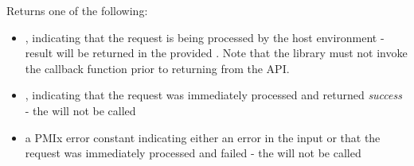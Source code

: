 \begin{arglist}
\end{arglist}

\descr

Returns one of the following:

\begin{itemize}
    \item {}, indicating that the request is being processed by the host environment - result will be returned in the provided . Note that the library must not invoke the callback function prior to returning from the \ac{API}.
    \item {}, indicating that the request was immediately processed and returned \textit{success} - the  will not be called
    \item a \ac{PMIx} error constant indicating either an error in the input or that the request was immediately processed and failed - the  will not be called
\end{itemize}


\descr



